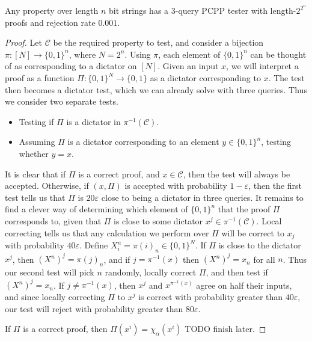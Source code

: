 \begin{theorem}
    Any property over length $n$ bit strings has a 3-query PCPP tester with length-$2^{2^n}$ proofs and rejection rate $0.001$.
\end{theorem}
\begin{proof}
    Let $\mathcal{C}$ be the required property to test, and consider a bijection $\pi: [N] \to \{ 0, 1 \}^n$, where $N = 2^n$. Using $\pi$, each element of $\{ 0, 1 \}^n$ can be thought of as corresponding to a dictator on $[N]$. Given an input $x$, we will interpret a proof as a function $\Pi: \{ 0, 1 \}^N \to \{ 0, 1 \}$ as a dictator corresponding to $x$. The test then becomes a dictator test, which we can already solve with three queries. Thus we consider two separate tests.
    \begin{itemize}
        \item Testing if $\Pi$ is a dictator in $\pi^{-1}(\mathcal{C})$.
        \item Assuming $\Pi$ is a dictator corresponding to an element $y \in \{ 0, 1 \}^n$, testing whether $y = x$.
    \end{itemize}
    It is clear that if $\Pi$ is a correct proof, and $x \in \mathcal{C}$, then the test will always be accepted. Otherwise, if $(x,\Pi)$ is accepted with probability $1 - \varepsilon$, then the first test tells us that $\Pi$ is $20 \varepsilon$ close to being a dictator in three queries. It remains to find a clever way of determining which element of $\{ 0, 1 \}^n$ that the proof $\Pi$ corresponds to, given that $\Pi$ is close to some dictator $x^j \in \pi^{-1}(\mathcal{C})$. Local correcting tells us that any calculation we perform over $\Pi$ will be correct to $x_j$ with probability $40 \varepsilon$. Define $X^n_i = \pi(i)_n \in \{ 0,1\}^N$. If $\Pi$ is close to the dictator $x^j$, then $(X^n)^j = \pi(j)_n$, and if $j = \pi^{-1}(x)$ then $(X^n)^j = x_n$ for all $n$. Thus our second test will pick $n$ randomly, locally correct $\Pi$, and then test if $(X^n)^j = x_n$. If $j \neq \pi^{-1}(x)$, then $x^j$ and $x^{\pi^{-1}(x)}$ agree on half their inputs, and since locally correcting $\Pi$ to $x^j$ is correct with probability greater than $40 \varepsilon$, our test will reject with probability greater than $80 \varepsilon$.

    If $\Pi$ is a correct proof, then $\Pi(x^i) = \chi_\alpha(x^i)$ TODO finish later.
\end{proof}

